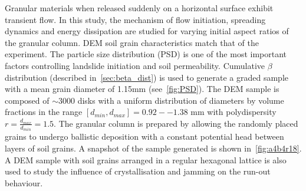 Granular materials when released suddenly on a 
horizontal surface exhibit transient flow. In this study, the mechanism of flow 
initiation, spreading dynamics and energy dissipation are studied for varying 
initial aspect ratios of the granular column. DEM soil grain characteristics 
match that of the experiment. The particle size distribution (PSD) is one of 
the most important factors controlling landslide initiation and soil 
permeability. Cumulative $\beta$ distribution (described 
in~\cref{sec:beta_dist}) %
 is used to generate a graded sample with a mean grain diameter of 1.15\si{\mm} 
 (see~\cref{fig:PSD}). 
The DEM sample is composed of $\sim3000$ disks with a uniform distribution of 
diameters by volume fractions in the range $[d_{min}, d_{max}] = 0.92 -- 1.38$ 
\si{\mm} with polydispersity $r = \frac{d_{max} }{d_{min}} = 1.5$. The 
granular column is prepared by allowing the randomly placed grains to undergo 
ballistic deposition with a constant potential head between layers of soil 
grains. A snapshot of the sample generated is shown in~\cref{fig:a4b4r18}. A 
DEM sample with soil grains arranged in a regular hexagonal lattice is also 
used to study the influence of crystallisation and jamming on the run-out 
behaviour.

